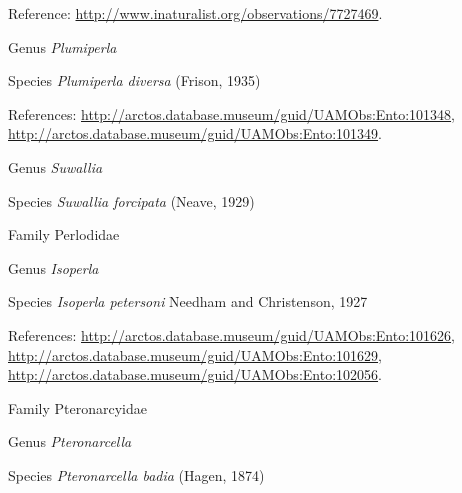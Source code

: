 \documentclass[9pt, article]{memoir}
\begin{document}
\begin{multicols}{2}
\vspace{6pt}Reference: 
\url{http://www.inaturalist.org/observations/7727469}.

\vspace{6pt}\noindent\hspace{30pt}Genus \textit{Plumiperla}


\vspace{6pt}\noindent\hspace{36pt}Species \textit{Plumiperla diversa} (Frison, 1935)


\vspace{6pt}References: 
\url{http://arctos.database.museum/guid/UAMObs:Ento:101348}, 
\url{http://arctos.database.museum/guid/UAMObs:Ento:101349}.

\vspace{6pt}\noindent\hspace{30pt}Genus \textit{Suwallia}


\vspace{6pt}\noindent\hspace{36pt}Species \textit{Suwallia forcipata} (Neave, 1929)


\vspace{6pt}\noindent\hspace{24pt}Family Perlodidae


\vspace{6pt}\noindent\hspace{30pt}Genus \textit{Isoperla}


\vspace{6pt}\noindent\hspace{36pt}Species \textit{Isoperla petersoni} Needham and Christenson, 1927


\vspace{6pt}References: 
\url{http://arctos.database.museum/guid/UAMObs:Ento:101626}, 
\url{http://arctos.database.museum/guid/UAMObs:Ento:101629}, 
\url{http://arctos.database.museum/guid/UAMObs:Ento:102056}.

\vspace{6pt}\noindent\hspace{24pt}Family Pteronarcyidae


\vspace{6pt}\noindent\hspace{30pt}Genus \textit{Pteronarcella}


\vspace{6pt}\noindent\hspace{36pt}Species \textit{Pteronarcella badia} (Hagen, 1874)



\end{multicols}
\end{document}
